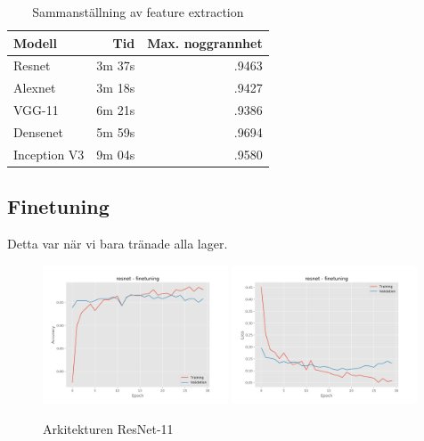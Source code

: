 \documentclass{kththesis}
\begin{document}
    \begin{table}
      \centering
      \begin{tabular}{|l|r|r|}
        Modell & Tid & Max. noggrannhet \\ 
        \hline
        Resnet       & 3m 37s & .9463 \\
        Alexnet      & 3m 18s & .9427 \\
        VGG-11       & 6m 21s & .9386 \\
        Densenet     & 5m 59s & .9694 \\
        Inception V3 & 9m 04s  & .9580 \\
      \end{tabular}
      \caption{Sammanställning av feature extraction} \label{tab:sometab}
    \end{table}

    \subsection{Finetuning}
    Detta var när vi bara tränade alla lager.

    \begin{figure}
      \centering
      \includegraphics[width=0.49\textwidth]{"./balcony/balcony-20split - acc - resnet - finetuning"}
      \includegraphics[width=0.49\textwidth]{"./balcony/balcony-20split - loss - resnet - finetuning"}
      \caption{Arkitekturen ResNet-11}
    \end{figure}
\end{document}
